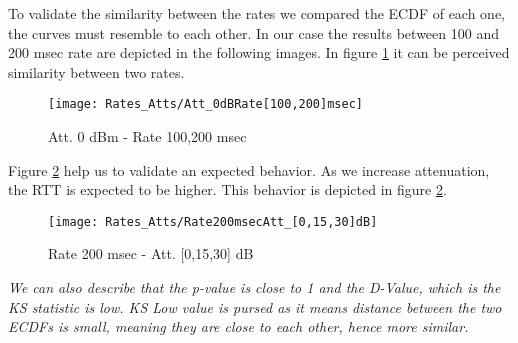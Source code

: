 To validate the similarity between the rates we compared the ECDF of each one, the curves must resemble to each other. In our case the results between 100 and 200 msec rate are depicted in the following images. In figure \ref{att_0_100and200msec} it can be perceived similarity between two rates.

\begin{figure}[h]
	\centering
	\texttt{[image: Rates\_Atts/Att\_0dBRate[100,200]msec]}
	\caption{Att. 0 dBm - Rate 100,200 msec}
	\label{att_0_100and200msec}
\end{figure}

Figure \ref{rate_200msec_Att_0_15_30dBm} help us to validate an expected behavior. As we increase attenuation, the RTT is expected to be higher. This behavior is depicted in figure \ref{rate_200msec_Att_0_15_30dBm}.

\begin{figure}[h]
	\centering
	\texttt{[image: Rates\_Atts/Rate200msecAtt\_[0,15,30]dB]}
	\caption{Rate 200 msec - Att. [0,15,30] dB}
	\label{rate_200msec_Att_0_15_30dBm}
\end{figure}

\emph{We can also describe that the p-value is close to 1 and the D-Value, which is the KS statistic is low. KS Low value is pursed as it means distance between the two ECDFs is small, meaning they are close to each other, hence more similar.}